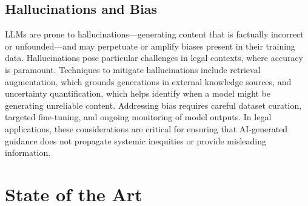 \subsection{Hallucinations and Bias}
LLMs are prone to hallucinations—generating content that is factually incorrect 
or unfounded—and may perpetuate or amplify biases present in their training data. 
Hallucinations pose particular challenges in legal contexts, where accuracy is 
paramount. Techniques to mitigate hallucinations include retrieval augmentation, 
which grounds generations in external knowledge sources, and uncertainty 
quantification, which helps identify when a model might be generating unreliable 
content. Addressing bias requires careful dataset curation, targeted fine-tuning, 
and ongoing monitoring of model outputs. In legal applications, these considerations 
are critical for ensuring that AI-generated guidance does not propagate systemic 
inequities or provide misleading information.

\section{State of the Art}
